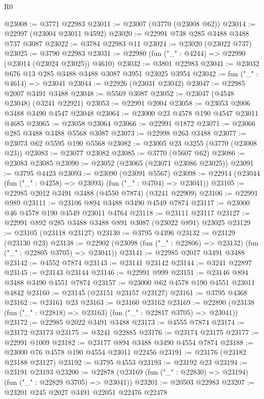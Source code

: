 \begin{lexlean}{R0}
\begin{coremodule}
@23008 := @3771 @22983
@23011 := @23007 (@3770 (@23008 @62))
@23014 := @22997 (@23004 @23011 @4592)
@23020 := @22991 @738 @285 @3488 @3488 @737 @3087
@23022 := @3784 @22983 @11
@23024 := @23020 (@23022 @737)
@23025 := @3790 @22983
@23031 := @22980 (fun ("_" : @4244) => @22990 (@23014 (@23024 @23025)) @4610)
@23032 := @3801 @22983
@23041 := @23032 @676 @13 @285 @3488 @3488 @3087 @3951 @23025 @3954
@23042 := fun ("_" : @4614) => @23041
@23044 := @22926 (@23031 @23042)
@23047 := @22985 @2007 @3491 @3488
@23048 := @5569 @3087
@23052 := @23047 (@4548 @23048) (@3241 @22921)
@23053 := @22991 @2004
@23058 := @23053 @2006 @3488 @3490 @4547 @23048
@23064 := @23000 @23 @4578 @190 @4547 @23011 @4685
@23065 := @23058 @23064
@23066 := @22991 @1872
@23071 := @23066 @285 @3488 @3488 @5568 @3087
@23073 := @22998 @263 @3488
@23077 := @23073 @62 @5595 @190 @5568
@23082 := @23005 @23 @3255 (@3770 (@23008 @23))
@23083 := @23077 @23082
@23085 := @3770 (@5607 @62)
@23086 := @23083 @23085
@23090 := @23052 (@23065 (@23071 @23086 @23025))
@23091 := @3795 @4423
@23093 := @23090 (@23091 @5567)
@23098 := @22914 (@23044 (fun ("_" : @4258) => @23093) (fun ("_" : @4704) => @23041))
@23105 := @22985 @2012 @3491 @3488 (@4550 @7874) (@3241 @22909)
@23106 := @22991 @989
@23111 := @23106 @894 @3488 @3490 @4549 @7874
@23117 := @23000 @46 @4578 @190 @4549 @23011 @4764
@23118 := @23111 @23117
@23127 := @22991 @892 @285 @3488 @3488 @891 @3087 (@23022 @891) @23025
@23129 := @23105 (@23118 @23127)
@23130 := @3795 @4396
@23132 := @23129 (@23130 @23)
@23138 := @22902 (@23098 (fun ("_" : @22806) => @23132) (fun ("_" : @22805 @3705) => @23041))
@23141 := @22985 @2017 @3491 @3488
@23142 := @4552 @7874
@23143 := @23141 @23142
@23144 := @3241 @22897
@23145 := @23143 @23144
@23146 := @22991 @999
@23151 := @23146 @894 @3488 @3490 @4551 @7874
@23157 := @23000 @62 @4578 @190 @4551 @23011 @4842
@23160 := @23145 (@23151 @23157 @23127)
@23161 := @3795 @4368
@23162 := @23161 @23
@23163 := @23160 @23162
@23169 := @22890 (@23138 (fun ("_" : @22818) => @23163) (fun ("_" : @22817 @3705) => @23041))
@23172 := @22985 @2022 @3491 @3488
@23173 := @4555 @7874
@23174 := @23172 @23173
@23175 := @3241 @22885
@23176 := @23174 @23175
@23177 := @22991 @1009
@23182 := @23177 @894 @3488 @3490 @4554 @7874
@23188 := @23000 @76 @4578 @190 @4554 @23011 @22456
@23191 := @23176 (@23182 @23188 @23127)
@23192 := @3795 @4553
@23193 := @23192 @23
@23194 := @23191 @23193
@23200 := @22878 (@23169 (fun ("_" : @22830) => @23194) (fun ("_" : @22829 @3705) => @23041))
@23201 := @20503 @22983
@23207 := @23201 @245 @2027 @3491 @22051 @22476 @22478

\end{coremodule}
\end{lexlean}
